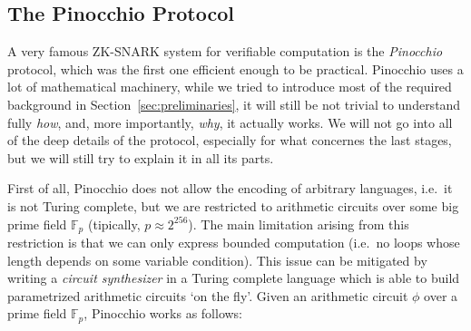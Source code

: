\subsection{The Pinocchio Protocol}
A very famous ZK-SNARK system for verifiable computation is the \emph{Pinocchio} protocol,
which was the first one efficient enough to be practical.
Pinocchio uses a lot of mathematical machinery, while we tried to introduce most of the required
background in Section~\ref{sec:preliminaries}, it will still be not trivial to understand fully
\emph{how}, and, more importantly, \emph{why}, it actually works.
We will not go into all of the deep details of the protocol, especially for what concernes the
last stages, but we will still try to explain it in all its parts.

First of all, Pinocchio does not allow the encoding of arbitrary languages, i.e.\ it is not Turing
complete, but we are restricted to arithmetic circuits over some big prime field \(\mathbb{F}_p\)
(tipically, \(p \approx 2^{256}\)).
The main limitation arising from this restriction is that we can only express bounded computation
(i.e.\ no loops whose length depends on some variable condition).
This issue can be mitigated by writing a \emph{circuit synthesizer} in a Turing complete language
which is able to build parametrized arithmetic circuits `on the fly'.
Given an arithmetic circuit \(\phi \) over a prime field \(\mathbb{F}_p\), Pinocchio works as
follows:
